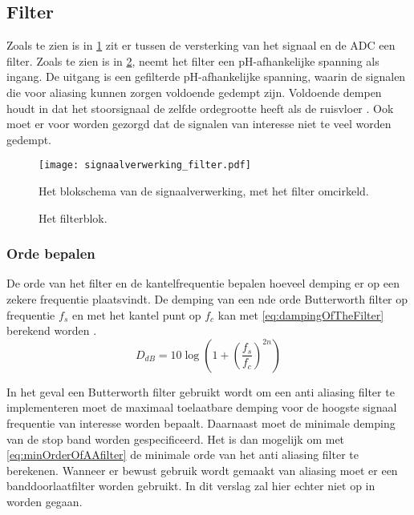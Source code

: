 \subsection{Filter}
Zoals te zien is in \cref{fig:filterInSchema} zit er tussen de versterking van het signaal en de ADC een filter. Zoals te zien is in \cref{fig:filterBlok}, neemt het filter een pH-afhankelijke spanning als ingang. De uitgang is een gefilterde pH-afhankelijke spanning, waarin de signalen die voor aliasing kunnen zorgen voldoende gedempt zijn. Voldoende dempen houdt in dat het stoorsignaal de zelfde ordegrootte heeft als de ruisvloer \cite{energieZuinigeSystemenOntwerpen}. Ook moet er voor worden gezorgd dat de signalen van interesse niet te veel worden gedempt.
\begin{figure}[!htbp]
    \centering
    \texttt{[image: signaalverwerking\_filter.pdf]}
    \caption{Het blokschema van de signaalverwerking, met het filter omcirkeld.}
    \label{fig:filterInSchema}
\end{figure}

\begin{figure}[!htbp]
    \centering
    \def\svgwidth{0.4\textwidth}
    
    \caption{Het filterblok.}
    \label{fig:filterBlok}
\end{figure}


\subsubsection{Orde bepalen} \label{sec:DetermineAAorder}
De orde van het filter en de kantelfrequentie bepalen hoeveel demping er op een zekere frequentie plaatsvindt. De demping van een nde orde Butterworth filter op frequentie $f_s$ en met het kantel punt op $f_c$ kan met \cref{eq:dampingOfTheFilter} berekend worden \cite{electronicFilterDesignHandbook}.
\begin{equation} \label{eq:dampingOfTheFilter}
    D_{dB}=10\log\left(1+\left(\frac{f_s}{f_c}\right)^{2n}\right)
\end{equation}

In het geval een Butterworth filter gebruikt wordt om een anti aliasing filter te implementeren moet de maximaal toelaatbare demping voor de hoogste signaal frequentie van interesse worden bepaalt. Daarnaast moet de minimale demping van de stop band worden gespecificeerd. Het is dan mogelijk om met \cref{eq:minOrderOfAAfilter} de minimale orde van het anti aliasing filter te berekenen.
Wanneer er bewust gebruik wordt gemaakt van aliasing moet er een banddoorlaatfilter worden gebruikt. In dit verslag zal hier echter niet op in worden gegaan.

